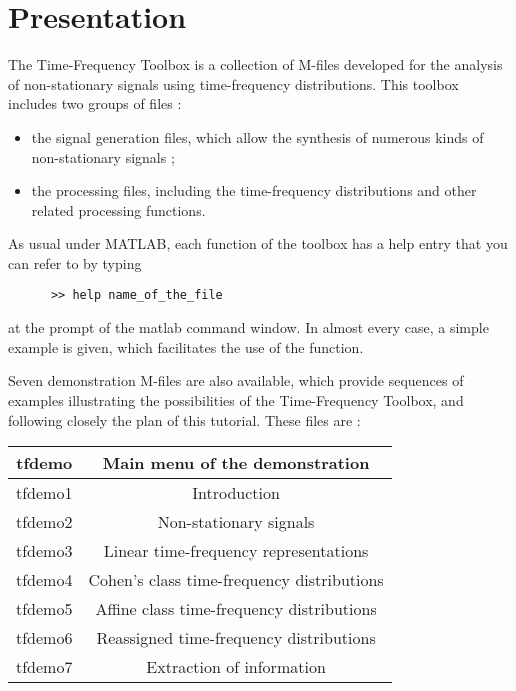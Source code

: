
\section{Presentation}

  The Time-Frequency Toolbox is a collection of M-files developed for the
analysis of non-stationary signals using time-frequency distributions.
This toolbox includes two groups of files :

\begin{itemize}
\item the signal generation files, which allow the synthesis of
numerous kinds of non-stationary signals ;
\item the processing files, including the time-frequency distributions
and other related processing functions.
\end{itemize}
	
  As usual under MATLAB, each function of the toolbox has a help entry that
you can refer to by typing
\begin{verbatim}
      >> help name_of_the_file
\end{verbatim}
at the prompt of the matlab command window. In almost every case, a simple
example is given, which facilitates the use of the function.

  Seven demonstration M-files are also available, which provide sequences
of examples illustrating the possibilities of the Time-Frequency Toolbox,
and following closely the plan of this tutorial. These files are :

\begin{center}
\begin{tabular}{|c|c|}
\hline tfdemo  & Main menu of the demonstration\\
\hline \hline tfdemo1 & Introduction\\
\hline tfdemo2 & Non-stationary signals\\
\hline tfdemo3 & Linear time-frequency representations\\
\hline tfdemo4 & Cohen's class time-frequency distributions\\
\hline tfdemo5 & Affine class time-frequency distributions\\
\hline tfdemo6 & Reassigned time-frequency distributions\\
\hline tfdemo7 & Extraction of information\\
\hline
\end{tabular}
\end{center}

